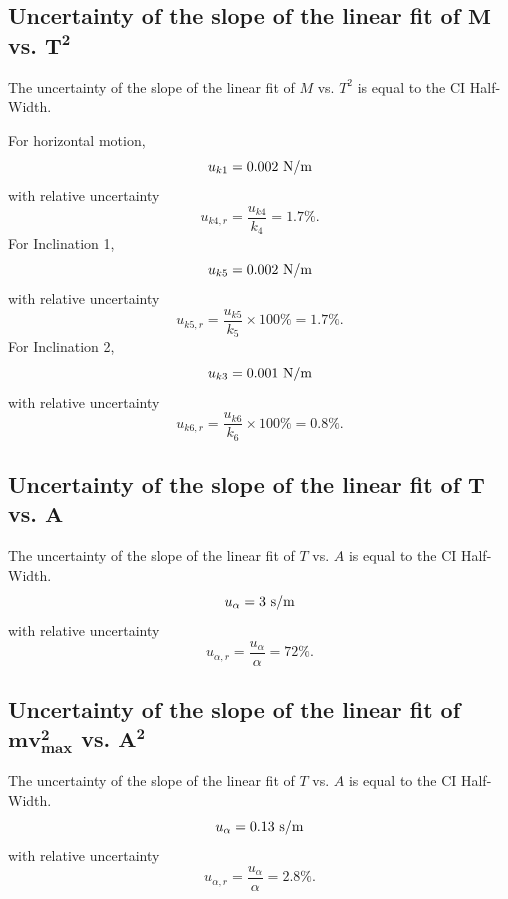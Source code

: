 \documentclass[a4paper]{report}
\begin{document}
	\subsection{Uncertainty of the slope of the linear fit of $\bm{M}$ vs. $\bm{T^2}$}
	The uncertainty of the slope of the linear fit of $M$ vs. $T^2$ is equal to the CI Half-Width.
	
	For horizontal motion,
	\begin{equation*}
	u_{k1}=0.002\ \rm{N/m}
	\end{equation*}
	with relative uncertainty
	\begin{equation*}
	u_{k4,r}=\dfrac{u_{k4}}{k_4}=1.7\%.
	\end{equation*}
	For Inclination 1,
	\begin{equation*}
	u_{k5}=0.002\ \rm{N/m}
	\end{equation*}
	with relative uncertainty
	\begin{equation*}
	u_{k5,r}=\dfrac{u_{k5}}{k_5}\times100\%=1.7\%.
	\end{equation*}
	For Inclination 2,
	\begin{equation*}
	u_{k3}=0.001\ \rm{N/m}
	\end{equation*}
	with relative uncertainty
	\begin{equation*}
	u_{k6,r}=\dfrac{u_{k6}}{k_6}\times100\%=0.8\%.
	\end{equation*}
	\subsection{Uncertainty of the slope of the linear fit of $\bm{T}$ vs. $\bm{A}$}
	The uncertainty of the slope of the linear fit of $T$ vs. $A$ is equal to the CI Half-Width.
	\begin{equation*}
	u_{\alpha}=3\ \rm{s/m}
	\end{equation*}
	with relative uncertainty
	\begin{equation*}
	u_{\alpha,r}=\dfrac{u_{\alpha}}{\alpha}=72\%.
	\end{equation*}
	\subsection{Uncertainty of the slope of the linear fit of $\bm{mv_{max}^2}$ vs. $\bm{A^2}$}
	The uncertainty of the slope of the linear fit of $T$ vs. $A$ is equal to the CI Half-Width.
	\begin{equation*}
	u_{\alpha}=0.13\ \rm{s/m}
	\end{equation*}
	with relative uncertainty
	\begin{equation*}
	u_{\alpha,r}=\dfrac{u_{\alpha}}{\alpha}=2.8\%.
	\end{equation*}
	\newpage
\end{document}
